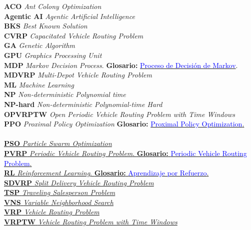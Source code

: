 
{\setlength{\parskip}{0.25cm}
\noindent \textbf{ACO} \textit{Ant Colony Optimization} \\
\noindent \textbf{Agentic AI} \textit{Agentic Artificial Intelligence}\\
\noindent \textbf{BKS} \textit{Best Known Solution}\\
\noindent \textbf{CVRP} \textit{Capacitated Vehicle Routing Problem}\\
\noindent \textbf{GA} \textit{Genetic Algorithm}\\
\noindent \textbf{GPU} \textit{Graphics Processing Unit}\\
\noindent \textbf{MDP} \textit{Markov Decision Process}. \textbf{Glosario:} \hyperlink{glo:mdp}{\textcolor{blue}{Proceso de Decisión de Markov}}.\\
\noindent \textbf{MDVRP} \textit{Multi-Depot Vehicle Routing Problem}\\
\noindent \textbf{ML} \textit{Machine Learning}\\
\noindent \textbf{NP} \textit{Non-deterministic Polynomial time}\\
\noindent \textbf{NP-hard} \textit{Non-deterministic Polynomial-time Hard}\\
\noindent \textbf{OPVRPTW} \textit{Open Periodic Vehicle Routing Problem with Time Windows}\\
\noindent \textbf{PPO} \textit{Proximal Policy Optimization} \textbf{Glosario:} \hyperlink{glo:ppo}{\textcolor{blue}{Proximal Policy Optimization}.\\\\
\noindent \textbf{PSO} \textit{Particle Swarm Optimization}\\
\noindent \textbf{PVRP} \textit{Periodic Vehicle Routing Problem}. \textbf{Glosario:} \hyperlink{glo:pvrp}{\textcolor{blue}{Periodic Vehicle Routing Problem}}.\\
\noindent \textbf{RL} \textit{Reinforcement Learning}. \textbf{Glosario:} \hyperlink{glo:rl}{\textcolor{blue}{Aprendizaje por Refuerzo}}.\\
\noindent \textbf{SDVRP} \textit{Split Delivery Vehicle Routing Problem}\\
\noindent \textbf{TSP} \textit{Traveling Salesperson Problem} \\
\noindent \textbf{VNS} \textit{Variable Neighborhood Search} \\
\noindent \textbf{VRP} \textit{Vehicle Routing Problem}\\
\noindent \textbf{VRPTW} \textit{Vehicle Routing Problem with Time Windows}
}

}

